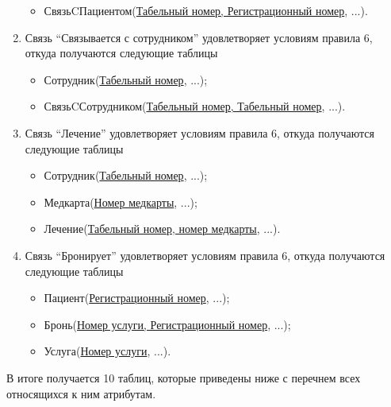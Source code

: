 \documentclass[14pt,a4paper,russian]{extreport}
\begin{document}
\begin{enumerate}
\begin{itemize}
            \item СвязьCПациентом(\underline{Табельный номер, Регистрационный номер}, ...).
        \end{itemize}
    \item Связь ``Связывается с сотрудником'' удовлетворяет условиям правила 6, откуда получаются
        следующие таблицы
        \begin{itemize}
            \item Сотрудник(\underline{Табельный номер}, ...);
            \item СвязьCСотрудником(\underline{Табельный номер, Табельный номер}, ...).
        \end{itemize}
    \item Связь ``Лечение'' удовлетворяет условиям правила 6, откуда получаются следующие таблицы
        \begin{itemize}
            \item Сотрудник(\underline{Табельный номер}, ...);
            \item Медкарта(\underline{Номер медкарты}, ...);
            \item Лечение(\underline{Табельный номер, номер медкарты}, ...).
        \end{itemize}
    \item Связь ``Бронирует'' удовлетворяет условиям правила 6, откуда получаются следующие
        таблицы
        \begin{itemize}
            \item Пациент(\underline{Регистрационный номер}, ...);
            \item Бронь(\underline{Номер услуги, Регистрационный номер}, ...);
            \item Услуга(\underline{Номер услуги}, ...).
        \end{itemize}
\end{enumerate}
В итоге получается 10 таблиц, которые приведены ниже с перечнем всех относящихся к ним атрибутам.
\end{document}
